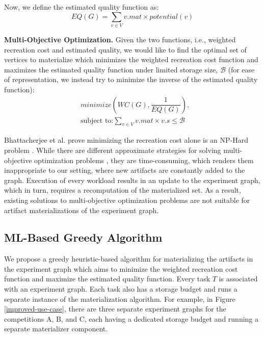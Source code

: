 Now, we define the estimated quality function as:
\[
EQ(G) =  \sum\limits_{v \in V}  v.mat \times potential(v)
\]

\textbf{Multi-Objective Optimization.}
Given the two functions, i.e., weighted recreation cost and estimated quality, we would like to find the optimal set of vertices to materialize which minimizes the weighted recreation cost function and maximizes the estimated quality function under limited storage size, $\mathcal{B}$ (for ease of representation, we instead try to minimize the inverse of the estimated quality function):
\begin{equation}
\begin{split}
& minimize(WC(G), \dfrac{1}{EQ(G)}), \\
& \text{subject to:} \sum\limits_{v \in V} v.mat \times v.s \leq \mathcal{B}
\end{split}
\end{equation}

Bhattacherjee et al. prove minimizing the recreation cost alone is an NP-Hard problem \cite{bhattacherjee2015principles}.
While there are different approximate strategies for solving multi-objective optimization problems \cite{coello2007evolutionary}, they are time-consuming, which renders them inappropriate to our setting, where new artifacts are constantly added to the graph.
Execution of every workload results in an update to the experiment graph, which in turn, requires a recomputation of the materialized set.
As a result, existing solutions to multi-objective optimization problems are not suitable for artifact materializations of the experiment graph.

\subsection{ML-Based Greedy Algorithm}\label{subsec-ml-based-materialization}
We propose a greedy heuristic-based algorithm for materializing the artifacts in the experiment graph which aims to minimize the weighted recreation cost function and maximize the estimated quality function.
Every task $T$ is associated with an experiment graph.
Each task also has a storage budget and runs a separate instance of the materialization algorithm.
For example, in Figure \ref{improved-use-case}, there are three separate experiment graphs for the competitions A, B, and C, each having a dedicated storage budget and running a separate materializer component.

